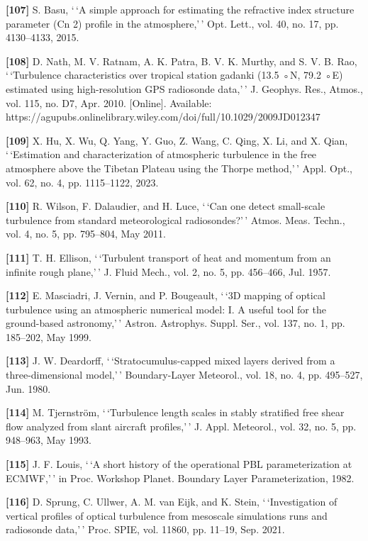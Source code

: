 \documentclass[
]{article}
\begin{document}
\textbf{{[}107{]}} S. Basu, `\,`A simple approach for estimating the
refractive index structure parameter (Cn 2) profile in the
atmosphere,'\,' Opt. Lett., vol. 40, no. 17, pp. 4130--4133, 2015.

\textbf{{[}108{]}} D. Nath, M. V. Ratnam, A. K. Patra, B. V. K. Murthy,
and S. V. B. Rao, `\,`Turbulence characteristics over tropical station
gadanki (13.5 ◦N, 79.2 ◦E) estimated using high-resolution GPS
radiosonde data,'\,' J. Geophys. Res., Atmos., vol. 115, no. D7, Apr.
2010. {[}Online{]}. Available:
https://agupubs.onlinelibrary.wiley.com/doi/full/10.1029/2009JD012347

\textbf{{[}109{]}} X. Hu, X. Wu, Q. Yang, Y. Guo, Z. Wang, C. Qing, X.
Li, and X. Qian, `\,`Estimation and characterization of atmospheric
turbulence in the free atmosphere above the Tibetan Plateau using the
Thorpe method,'\,' Appl. Opt., vol. 62, no. 4, pp. 1115--1122, 2023.

\textbf{{[}110{]}} R. Wilson, F. Dalaudier, and H. Luce, `\,`Can one
detect small-scale turbulence from standard meteorological
radiosondes?'\,' Atmos. Meas. Techn., vol. 4, no. 5, pp. 795--804, May
2011.

\textbf{{[}111{]}} T. H. Ellison, `\,`Turbulent transport of heat and
momentum from an infinite rough plane,'\,' J. Fluid Mech., vol. 2, no.
5, pp. 456--466, Jul. 1957.

\textbf{{[}112{]}} E. Masciadri, J. Vernin, and P. Bougeault, `\,`3D
mapping of optical turbulence using an atmospheric numerical model: I. A
useful tool for the ground-based astronomy,'\,' Astron. Astrophys.
Suppl. Ser., vol. 137, no. 1, pp. 185--202, May 1999.

\textbf{{[}113{]}} J. W. Deardorff, `\,`Stratocumulus-capped mixed
layers derived from a three-dimensional model,'\,' Boundary-Layer
Meteorol., vol. 18, no. 4, pp. 495--527, Jun. 1980.

\textbf{{[}114{]}} M. Tjernström, `\,`Turbulence length scales in stably
stratified free shear flow analyzed from slant aircraft profiles,'\,' J.
Appl. Meteorol., vol. 32, no. 5, pp. 948--963, May 1993.

\textbf{{[}115{]}} J. F. Louis, `\,`A short history of the operational
PBL parameterization at ECMWF,'\,' in Proc. Workshop Planet. Boundary
Layer Parameterization, 1982.

\textbf{{[}116{]}} D. Sprung, C. Ullwer, A. M. van Eijk, and K. Stein,
`\,`Investigation of vertical profiles of optical turbulence from
mesoscale simulations runs and radiosonde data,'\,' Proc. SPIE, vol.
11860, pp. 11--19, Sep. 2021.
\end{document}

